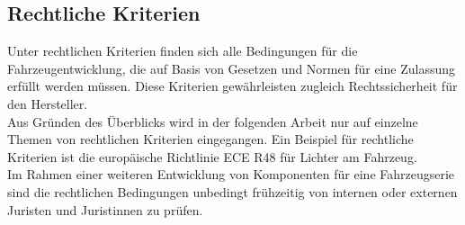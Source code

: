 \subsection{Rechtliche Kriterien}
Unter rechtlichen Kriterien finden sich alle Bedingungen für die Fahrzeugentwicklung, die auf Basis von Gesetzen und Normen für eine Zulassung erfüllt werden müssen. Diese Kriterien gewährleisten zugleich Rechtssicherheit für den Hersteller. \\
Aus Gründen des Überblicks wird in der folgenden Arbeit nur auf einzelne Themen von rechtlichen Kriterien eingegangen. 
Ein Beispiel für rechtliche Kriterien ist die europäische Richtlinie ECE R48 für Lichter am Fahrzeug. \cite[Vgl. Seite 1 ff.]{R48.2016} \\
Im Rahmen einer weiteren Entwicklung von Komponenten für eine Fahrzeugserie sind die rechtlichen Bedingungen unbedingt frühzeitig von internen oder externen Juristen und Juristinnen zu prüfen.
